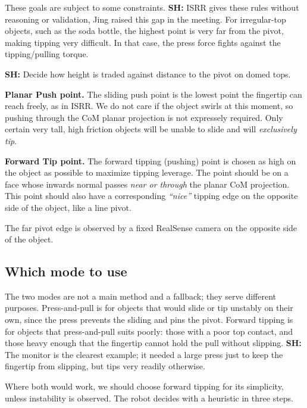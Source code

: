 \documentclass[10pt, conference]{IEEEtran}
\newcommand{\sh}[1]{\textcolor{orange!90!black}{\textbf{SH:} #1}}
\begin{document}
These goals are subject to some constraints. \sh{ISRR gives these rules without reasoning or validation, Jing raised this gap in the meeting.} For irregular-top objects, such as the soda bottle, the highest point is very far from the pivot, making tipping very difficult. In that case, the press force fights against the tipping/pulling torque.

\sh{Decide how height is traded against distance to the pivot on domed
tops.}

\medskip\noindent\textbf{Planar Push point.} The sliding push point is the lowest point the fingertip can reach freely, as in ISRR. We do not care if the object swirls at this moment, so pushing through the CoM planar projection is not expressely required. Only certain very tall, high friction objects will be unable to slide and will \textit{exclusively tip}.

\medskip\noindent\textbf{Forward Tip point.}
The forward tipping (pushing) point is chosen as high on the object as possible to maximize tipping leverage. The point should be on a face whose inwards normal passes \textit{near or through} the planar CoM projection. This point should also have a corresponding \textit{``nice''} tipping edge on the opposite side of the object, like a line pivot.

The far pivot edge is observed by a fixed RealSense camera on the opposite side of the object.

\subsection{Which mode to use}

The two modes are not a main method and a fallback; they serve different purposes. Press-and-pull is for objects that would slide or tip unstably on their own, since the press prevents the sliding and pins the pivot. Forward tipping is for objects that press-and-pull suits poorly: those with a poor top contact, and those heavy enough that the fingertip cannot hold the pull without slipping. \sh{The monitor is the clearest example; it needed a large press just to keep the fingertip from slipping, but tips very readily otherwise.}

Where both would work, we should choose forward tipping for its simplicity, unless instability is observed. The robot decides with a heuristic in three steps.
\end{document}

